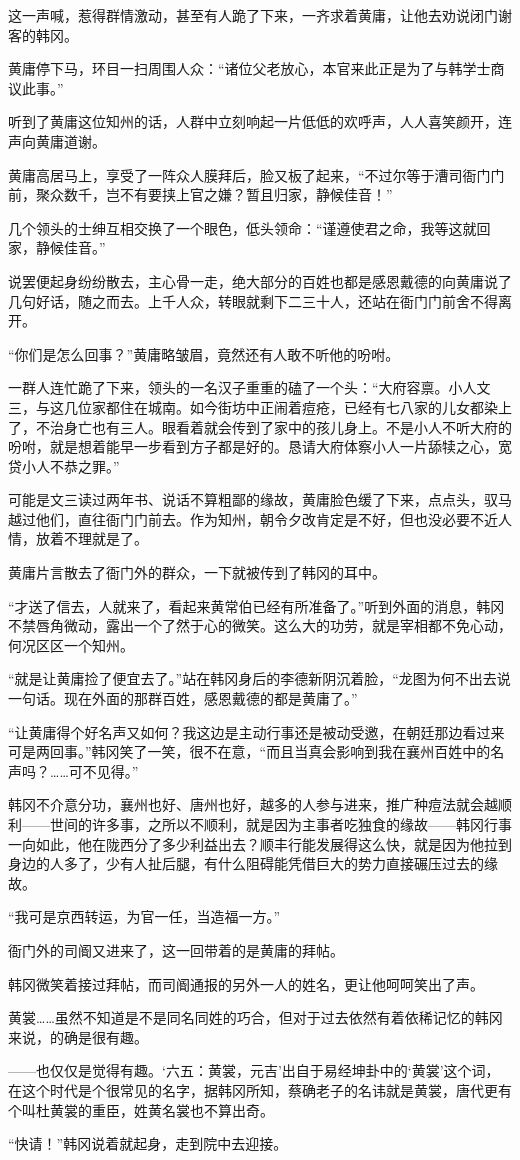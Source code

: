 这一声喊，惹得群情激动，甚至有人跪了下来，一齐求着黄庸，让他去劝说闭门谢客的韩冈。

黄庸停下马，环目一扫周围人众：“诸位父老放心，本官来此正是为了与韩学士商议此事。”

听到了黄庸这位知州的话，人群中立刻响起一片低低的欢呼声，人人喜笑颜开，连声向黄庸道谢。

黄庸高居马上，享受了一阵众人膜拜后，脸又板了起来，“不过尔等于漕司衙门门前，聚众数千，岂不有要挟上官之嫌？暂且归家，静候佳音！”

几个领头的士绅互相交换了一个眼色，低头领命：“谨遵使君之命，我等这就回家，静候佳音。”

说罢便起身纷纷散去，主心骨一走，绝大部分的百姓也都是感恩戴德的向黄庸说了几句好话，随之而去。上千人众，转眼就剩下二三十人，还站在衙门门前舍不得离开。

“你们是怎么回事？”黄庸略皱眉，竟然还有人敢不听他的吩咐。

一群人连忙跪了下来，领头的一名汉子重重的磕了一个头：“大府容禀。小人文三，与这几位家都住在城南。如今街坊中正闹着痘疮，已经有七八家的儿女都染上了，不治身亡也有三人。眼看着就会传到了家中的孩儿身上。不是小人不听大府的吩咐，就是想着能早一步看到方子都是好的。恳请大府体察小人一片舔犊之心，宽贷小人不恭之罪。”

可能是文三读过两年书、说话不算粗鄙的缘故，黄庸脸色缓了下来，点点头，驭马越过他们，直往衙门门前去。作为知州，朝令夕改肯定是不好，但也没必要不近人情，放着不理就是了。

黄庸片言散去了衙门外的群众，一下就被传到了韩冈的耳中。

“才送了信去，人就来了，看起来黄常伯已经有所准备了。”听到外面的消息，韩冈不禁唇角微动，露出一个了然于心的微笑。这么大的功劳，就是宰相都不免心动，何况区区一个知州。

“就是让黄庸捡了便宜去了。”站在韩冈身后的李德新阴沉着脸，“龙图为何不出去说一句话。现在外面的那群百姓，感恩戴德的都是黄庸了。”

“让黄庸得个好名声又如何？我这边是主动行事还是被动受邀，在朝廷那边看过来可是两回事。”韩冈笑了一笑，很不在意，“而且当真会影响到我在襄州百姓中的名声吗？……可不见得。”

韩冈不介意分功，襄州也好、唐州也好，越多的人参与进来，推广种痘法就会越顺利——世间的许多事，之所以不顺利，就是因为主事者吃独食的缘故——韩冈行事一向如此，他在陇西分了多少利益出去？顺丰行能发展得这么快，就是因为他拉到身边的人多了，少有人扯后腿，有什么阻碍能凭借巨大的势力直接碾压过去的缘故。

“我可是京西转运，为官一任，当造福一方。”

衙门外的司阍又进来了，这一回带着的是黄庸的拜帖。

韩冈微笑着接过拜帖，而司阍通报的另外一人的姓名，更让他呵呵笑出了声。

黄裳……虽然不知道是不是同名同姓的巧合，但对于过去依然有着依稀记忆的韩冈来说，的确是很有趣。

——也仅仅是觉得有趣。‘六五：黄裳，元吉’出自于易经坤卦中的‘黄裳’这个词，在这个时代是个很常见的名字，据韩冈所知，蔡确老子的名讳就是黄裳，唐代更有个叫杜黄裳的重臣，姓黄名裳也不算出奇。

“快请！”韩冈说着就起身，走到院中去迎接。

